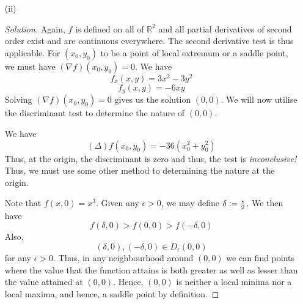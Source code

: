 \documentclass[12pt]{article}
\theoremstyle{definition}
\newenvironment{soln}{\begin{proof}[Solution]}{\end{proof}}
\begin{document}
\begin{enumerate}[leftmargin=*]
\begin{enumerate}[leftmargin=*]
\begin{soln}
            \medskip
            
            For $(0, \pm \sqrt{2})$, the discriminant turns out to be positive along with $f_{xx}$ positive and hence, these are points of local minima. For $(\pm \sqrt{2}, 0)$, the discriminant turns out to be positive along with $f_{xx}$ negative and hence, these are points of local maxima.
        \end{soln}
        
        \newpage
        
        \item[(ii)] \begin{soln}
            Again, $f$ is defined on all of $\mathbb{R}^2$ and all partial derivatives of second order exist and are continuous everywhere. The second derivative test is thus applicable. For $(x_0, y_0)$ to be a point of local extremum or a saddle point, we must have $(\nabla f)(x_0, y_0) = 0$. We have
            \[
                f_x(x,y) = 3x^2 - 3y^2
            \]
            \[
                f_y(x,y) = -6xy
            \]
            Solving $(\nabla f)(x_0, y_0) = 0$ gives us the solution $(0,0)$. We will now utilise the discriminant test to determine the nature of $(0,0)$. 
            
            \medskip
            
            We have
            \[
                \left( \Delta \right) f(x_0, y_0) = -36(x_0^2 + y_0^2 )
            \]
            Thus, at the origin, the discriminant is zero and thus, the test is \emph{inconclusive!} Thus, we must use some other method to determining the nature at the origin. 
            
            \medskip
            
            Note that $f(x, 0) = x^3$. Given any $\epsilon > 0$, we may define $\delta \vcentcolon= \frac{\epsilon}{2}$. We then have
            \[
                f(\delta, 0) > f(0,0) > f(-\delta, 0)
            \]
            Also, 
            \[
                (\delta, 0), (-\delta, 0) \in D_{\epsilon}(0,0)
            \]
            for any $\epsilon > 0$. Thus, in any neighbourhood around $(0,0)$ we can find points where the value that the function attains is both greater as well as lesser than the value attained at $(0,0)$. Hence, $(0,0)$ is neither a local minima nor a local maxima, and hence, a saddle point by definition.
        \end{soln}
    \end{enumerate}
    

\end{enumerate}
\end{document}
